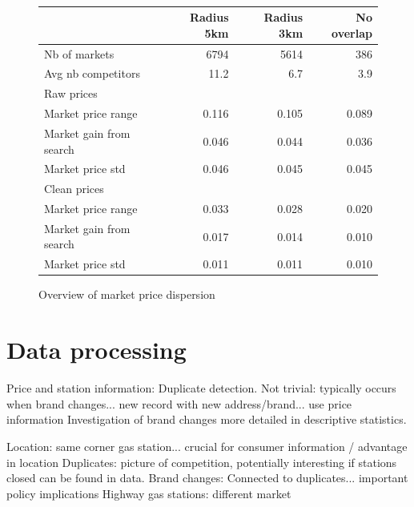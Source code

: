 \documentclass[11pt]{article}
\begin{document}
\ \\
\begin{figure}
\caption{Overview of market price dispersion}
\begin{center}
\begin{tabular}{lrrr}
\hline
{} & Radius 5km & Radius 3km & No overlap\\
\hline
Nb of markets & 6794 & 5614 & 386 \\
Avg nb competitors & 11.2 & 6.7 & 3.9 \\
\hline
Raw prices & & & \\
\hline
Market price range & 0.116 & 0.105 & 0.089\\
Market gain from search & 0.046 & 0.044 & 0.036 \\
Market price std & 0.046 & 0.045 & 0.045 \\
\hline
Clean prices & & & \\
\hline
Market price range & 0.033  & 0.028 & 0.020 \\
Market gain from search & 0.017 & 0.014 & 0.010 \\
Market price std & 0.011 & 0.011 & 0.010 \\
\hline
\end{tabular}
\end{center}
\end{figure}

\newpage



\newpage

\appendix

\section{Data processing}

Price and station information: Duplicate detection. Not trivial: typically occurs when brand changes... new record with new address/brand... use price information
Investigation of brand changes more detailed in descriptive statistics.

Location: same corner gas station... crucial for consumer information / advantage in location
Duplicates: picture of competition, potentially interesting if stations closed can be found in data.
Brand changes: Connected to duplicates... important policy implications
Highway gas stations: different market
\end{document}
